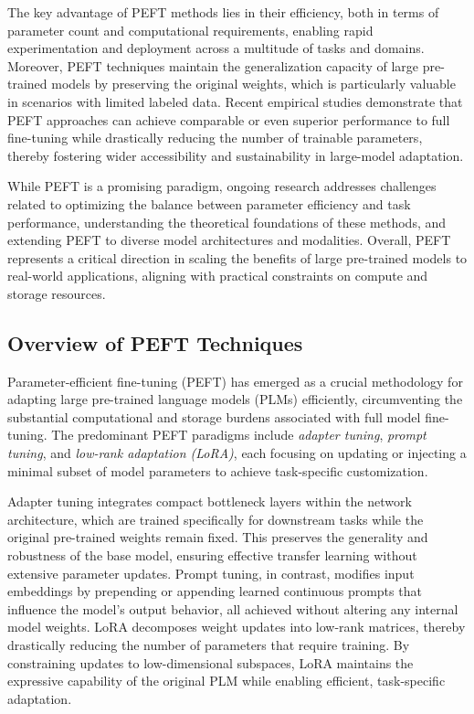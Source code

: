 \documentclass[sigconf]{acmart}
\begin{document}
The key advantage of PEFT methods lies in their efficiency, both in terms of parameter count and computational requirements, enabling rapid experimentation and deployment across a multitude of tasks and domains. Moreover, PEFT techniques maintain the generalization capacity of large pre-trained models by preserving the original weights, which is particularly valuable in scenarios with limited labeled data. Recent empirical studies demonstrate that PEFT approaches can achieve comparable or even superior performance to full fine-tuning while drastically reducing the number of trainable parameters, thereby fostering wider accessibility and sustainability in large-model adaptation.

While PEFT is a promising paradigm, ongoing research addresses challenges related to optimizing the balance between parameter efficiency and task performance, understanding the theoretical foundations of these methods, and extending PEFT to diverse model architectures and modalities. Overall, PEFT represents a critical direction in scaling the benefits of large pre-trained models to real-world applications, aligning with practical constraints on compute and storage resources.

\subsection{Overview of PEFT Techniques}

Parameter-efficient fine-tuning (PEFT) has emerged as a crucial methodology for adapting large pre-trained language models (PLMs) efficiently, circumventing the substantial computational and storage burdens associated with full model fine-tuning. The predominant PEFT paradigms include \textit{adapter tuning}, \textit{prompt tuning}, and \textit{low-rank adaptation (LoRA)}, each focusing on updating or injecting a minimal subset of model parameters to achieve task-specific customization.

Adapter tuning integrates compact bottleneck layers within the network architecture, which are trained specifically for downstream tasks while the original pre-trained weights remain fixed. This preserves the generality and robustness of the base model, ensuring effective transfer learning without extensive parameter updates. Prompt tuning, in contrast, modifies input embeddings by prepending or appending learned continuous prompts that influence the model’s output behavior, all achieved without altering any internal model weights. LoRA decomposes weight updates into low-rank matrices, thereby drastically reducing the number of parameters that require training. By constraining updates to low-dimensional subspaces, LoRA maintains the expressive capability of the original PLM while enabling efficient, task-specific adaptation.
\end{document}
